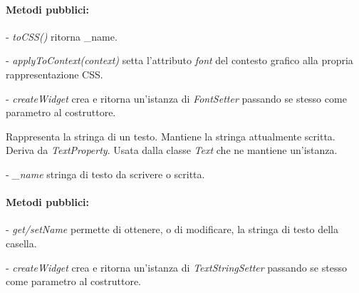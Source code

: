 \paragraph{Metodi pubblici:}
\begin{elencopuntato}[\subsubsecindent]
\item[-] \textit{toCSS()} ritorna {\_}name.
\item[-] \textit{applyToContext(context)} setta l'attributo \textit{font} del contesto grafico alla propria rappresentazione CSS.
\item[-] \textit{createWidget} crea e ritorna un'istanza di \textit{FontSetter} passando se stesso come parametro al costruttore.
\end{elencopuntato}

Rappresenta la stringa di un testo. Mantiene la stringa attualmente scritta.
Deriva da \textit{TextProperty}.
Usata dalla classe \textit{Text} che ne mantiene un'istanza.
\begin{elencopuntato}[\subsubsecindent]
\item[-] \textit{{\_}name} stringa di testo da scrivere o scritta.
\end{elencopuntato}
\paragraph{Metodi pubblici:}
\begin{elencopuntato}[\subsubsecindent]
\item[-] \textit{get/setName} permette di ottenere, o di modificare, la stringa di testo della casella.
\item[-] \textit{createWidget} crea e ritorna un'istanza di \textit{TextStringSetter} passando se stesso come parametro al costruttore.
\end{elencopuntato}

